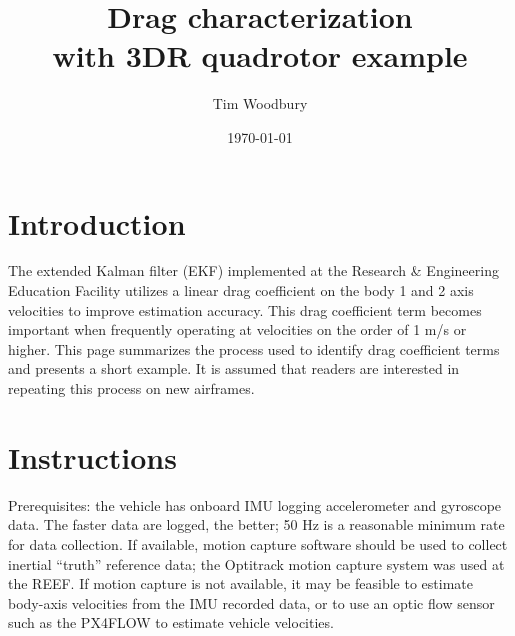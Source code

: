 \documentclass{article}
\title{Drag characterization \\ \large with 3DR quadrotor example}
\author{Tim Woodbury}
\date{\today} %
\begin{document}
\maketitle

\section{Introduction}

The extended Kalman filter (EKF) implemented at the Research \& Engineering Education Facility utilizes a linear drag coefficient on the body 1 and 2 axis velocities to improve estimation accuracy. This drag coefficient term becomes important when frequently operating at velocities on the order of 1 m/s or higher. This page summarizes the process used to identify drag coefficient terms and presents a short example. It is assumed that readers are interested in repeating this process on new airframes.

\section{Instructions}

Prerequisites: the vehicle has onboard IMU logging accelerometer and gyroscope data. The faster data are logged, the better; 50 Hz is a reasonable minimum rate for data collection. If available, motion capture software should be used to collect inertial ``truth'' reference data; the Optitrack motion capture system was used at the REEF. If motion capture is not available, it may be feasible to estimate body-axis velocities from the IMU recorded data, or to use an optic flow sensor such as the PX4FLOW to estimate vehicle velocities.
\end{document}
